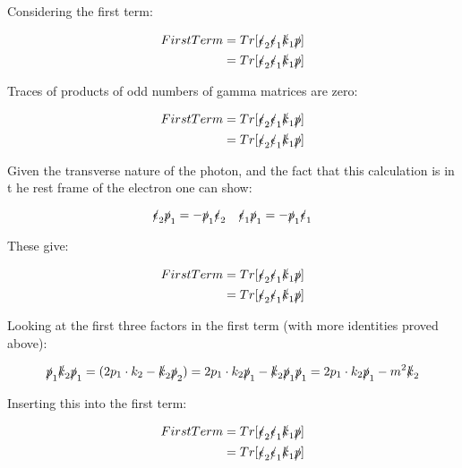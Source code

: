 \documentclass[a4]{article}
\begin{document}
    Considering the first term:

    \begin{eqnarray}
        First Term = Tr [\slashed{\epsilon}_2 \slashed{\epsilon}_1 \slashed{k}_1 \slashed{p}] \\
        = Tr [\slashed{\epsilon}_2 \slashed{\epsilon}_1 \slashed{k}_1 \slashed{p}]
    \end{eqnarray}

    Traces of products of odd numbers of gamma matrices are zero:

    \begin{eqnarray}
        First Term = Tr [\slashed{\epsilon}_2 \slashed{\epsilon}_1 \slashed{k}_1 \slashed{p}] \\
        = Tr [\slashed{\epsilon}_2 \slashed{\epsilon}_1 \slashed{k}_1 \slashed{p}]
    \end{eqnarray}

    Given the transverse nature of the photon, and the fact that this calculation is in t he rest frame of the electron one can show:

    \[
        \slashed{\epsilon}_2 \slashed{p}_1 = - \slashed{p}_1 \slashed{\epsilon}_2 \quad \slashed{\epsilon}_1 \slashed{p}_1 = - \slashed{p}_1 \slashed{\epsilon}_1
    \]

    These give:

    \begin{eqnarray}
        First Term = Tr [\slashed{\epsilon}_2 \slashed{\epsilon}_1 \slashed{k}_1 \slashed{p}] \\
        = Tr [\slashed{\epsilon}_2 \slashed{\epsilon}_1 \slashed{k}_1 \slashed{p}]
    \end{eqnarray}

    Looking at the first three factors in the first term (with more identities proved above):

    \begin{equation}
        \slashed{p}_1 \slashed{k}_2 \slashed{p}_1 = (2 p_1 \cdot k_2 - \slashed{k}_2 \slashed{p}_2) = 2 p_1 \cdot k_2 \slashed{p}_1 - \slashed{k}_2 \slashed{p}_1 \slashed{p}_1 = 2 p_1 \cdot k_2 \slashed{p}_1 - m^2 \slashed{k}_2
    \end{equation}

    Inserting this into the first term:

    \begin{eqnarray}
        First Term = Tr [\slashed{\epsilon}_2 \slashed{\epsilon}_1 \slashed{k}_1 \slashed{p}] \\
        = Tr [\slashed{\epsilon}_2 \slashed{\epsilon}_1 \slashed{k}_1 \slashed{p}]
    \end{eqnarray}
\end{document}
